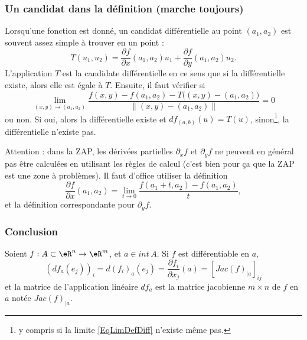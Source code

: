                     \subsubsection{Un candidat dans la définition (marche toujours)}

Lorsqu'une fonction est donné, un candidat différentielle au point $(a_1,a_2)$ est souvent assez simple à trouver en un point :
\begin{equation}
    T(u_1,u_2)=\frac{ \partial f }{ \partial x }(a_1,a_2)u_1+\frac{ \partial f }{ \partial y }(a_1,a_2)u_2.
\end{equation}
L'application $T$ est la candidate différentielle en ce sens que si la différentielle existe, alors elle est égale à $T$. Ensuite, il faut vérifier si
\begin{equation}        \label{EqLimDefDiff}
    \lim_{(x,y)\to (a_1,a_2)} \frac{f(x,y) - f(a_1,a_2) - T\big( (x,y)-(a_1,a_2) \big)}{\| (x,y)-(a_1,a_2) \|}=0
\end{equation}
ou non. Si oui, alors la différentielle existe et $df_{(a,b)}(u)=T(u)$, sinon\footnote{y compris si la limite \eqref{EqLimDefDiff} n'existe même pas.}, la différentielle n'existe pas.

Attention : dans la ZAP, les dérivées partielles $\partial_xf$ et $\partial_yf$ ne peuvent en général pas être calculées en utilisant les règles de calcul (c'est bien pour ça que la ZAP est une zone à problèmes). Il faut d'office utiliser la définition
\begin{equation}
    \frac{ \partial f }{ \partial x }(a_1,a_2)=\lim_{t\to 0}\frac{ f(a_1+t,a_2)-f(a_1,a_2) }{ t },
\end{equation}
et la définition correspondante pour $\partial_yf$.


\subsubsection*{Conclusion}
Soient $f:A\subset \eR^n \rightarrow \eR^m$, et $a\in int\,A$. Si $f$ est différentiable en $a$, $$ (df_a (e_j))_i = d(f_i)_a(e_j) =\frac{\partial f_i}{\partial x_j}(a)= [Jac(f)_{|a}]_{ij}$$ et la matrice de l'application linéaire $df_a$ est la matrice jacobienne $m\times n$ de $f$ en $a$ notée $Jac(f)_{|a}$.


